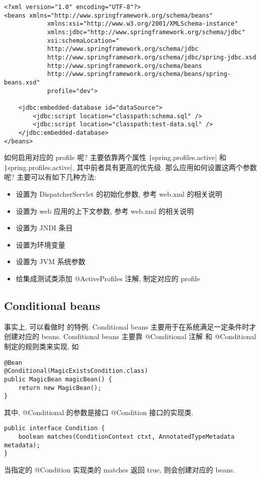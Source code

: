 \documentclass[UTF8, heading=true, scheme=chinese]{ctexart}
\begin{document}
\begin{verbatim}
<?xml version="1.0" encoding="UTF-8"?>
<beans xmlns="http://www.springframework.org/schema/beans"
			xmlns:xsi="http://www.w3.org/2001/XMLSchema-instance"
			xmlns:jdbc="http://www.springframework.org/schema/jdbc"
			xsi:schemaLocation="
			http://www.springframework.org/schema/jdbc
			http://www.springframework.org/schema/jdbc/spring-jdbc.xsd
			http://www.springframework.org/schema/beans
			http://www.springframework.org/schema/beans/spring-beans.xsd"
			profile="dev">
			
	<jdbc:embedded-database id="dataSource">
		<jdbc:script location="classpath:schema.sql" />
		<jdbc:script location="classpath:test-data.sql" />
	</jdbc:embedded-database>
</beans>
\end{verbatim}

如何启用对应的 profile 呢? 主要依靠两个属性 \texttt|spring.profiles.active| 和 \texttt|spring.profiles.active|, 其中前者具有更高的优先级.
那么应用如何设置这两个参数呢? 主要可以有如下几种方法:
\begin{itemize}
	\item 设置为 DispatcherServlet 的初始化参数, 参考 web.xml 的相关说明
	\item 设置为 web 应用的上下文参数, 参考 web.xml 的相关说明
	\item 设置为 JNDI 条目
	\item 设置为环境变量
	\item 设置为 JVM 系统参数
	\item 给集成测试类添加 @ActiveProfiles 注解, 制定对应的 profile
\end{itemize}






\subsection[Conditional beans]{Conditional beans} \label{sec:conditional}
事实上,  可以看做时  的特例. Conditional beans 主要用于在系统满足一定条件时才创建对应的 beans. 
Conditional beans 主要靠 @Conditional 注解 和 @Conditional 制定的规则类来实现,  如
\begin{verbatim}
@Bean
@Conditional(MagicExistsCondition.class)
public MagicBean magicBean() {
	return new MagicBean();
}
\end{verbatim}

其中, @Conditional 的参数是接口 @Condition 接口的实现类.
\begin{verbatim}
public interface Condition {
	boolean matches(ConditionContext ctxt, AnnotatedTypeMetadata metadata);
}
\end{verbatim}
当指定的 @Condition 实现类的 matches 返回 true, 则会创建对应的 beans.
\end{document}
